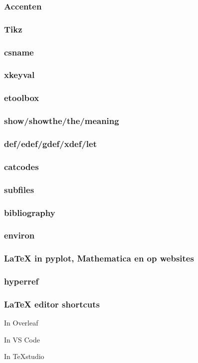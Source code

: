\documentclass{cursuspresentatie}
\begin{document}
	\begin{frame}
		\frametitle{Accenten}
	\end{frame}

	\begin{frame}
		\frametitle{Tikz}
	\end{frame}

	\begin{frame}
		\frametitle{csname}
	\end{frame}

	\begin{frame}
		\frametitle{xkeyval}
	\end{frame}

	\begin{frame}
		\frametitle{etoolbox}
	\end{frame}

	\begin{frame}
		\frametitle{show/showthe/the/meaning}
	\end{frame}

	\begin{frame}
		\frametitle{def/edef/gdef/xdef/let}
	\end{frame}

	\begin{frame}
		\frametitle{catcodes}
	\end{frame}

	\begin{frame}
		\frametitle{subfiles}
	\end{frame}

	\begin{frame}
		\frametitle{bibliography}
	\end{frame}

	\begin{frame}
		\frametitle{environ}
	\end{frame}

	\begin{frame}
		\frametitle{LaTeX in pyplot, Mathematica en op websites}
	\end{frame}

	\begin{frame}
		\frametitle{hyperref}
	\end{frame}

	\begin{frame}
		\frametitle{LaTeX editor shortcuts}

		In Overleaf

		In VS Code

		In TeXstudio
	\end{frame}
\end{document}
